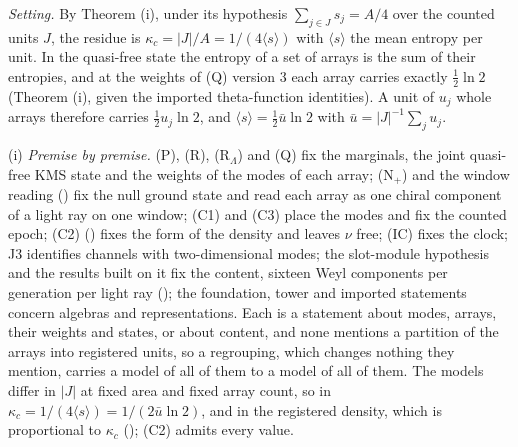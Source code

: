 \emph{Setting.} By Theorem (i), under its hypothesis $\sum_{j \in J}s_{j} = A/4$ over the counted units $J$, the residue is $\kappa_{c} = |J|/A = 1/(4\langle s\rangle)$ with $\langle s\rangle$ the mean entropy per unit. In the quasi-free state the entropy of a set of arrays is the sum of their entropies, and at the weights of (Q) version 3 each array carries exactly $\tfrac12\ln 2$ (Theorem (i), given the imported theta-function identities). A unit of $u_{j}$ whole arrays therefore carries $\tfrac12u_{j}\ln 2$, and $\langle s\rangle = \tfrac12\bar u\ln 2$ with $\bar u = |J|^{-1}\sum_{j}u_{j}$.

(i) \emph{Premise by premise.} (P), (R), (R$_{\Lambda}$) and (Q) fix the marginals, the joint quasi-free KMS state and the weights of the modes of each array; (N$_{+}$) and the window reading () fix the null ground state and read each array as one chiral component of a light ray on one window; (C1) and (C3) place the modes and fix the counted epoch; (C2) () fixes the form of the density and leaves $\nu$ free; (IC) fixes the clock; J3 identifies channels with two-dimensional modes; the slot-module hypothesis and the results built on it fix the content, sixteen Weyl components per generation per light ray (); the foundation, tower and imported statements concern algebras and representations. Each is a statement about modes, arrays, their weights and states, or about content, and none mentions a partition of the arrays into registered units, so a regrouping, which changes nothing they mention, carries a model of all of them to a model of all of them. The models differ in $|J|$ at fixed area and fixed array count, so in $\kappa_{c} = 1/(4\langle s\rangle) = 1/(2\bar u\ln 2)$, and in the registered density, which is proportional to $\kappa_{c}$ (); (C2) admits every value.

